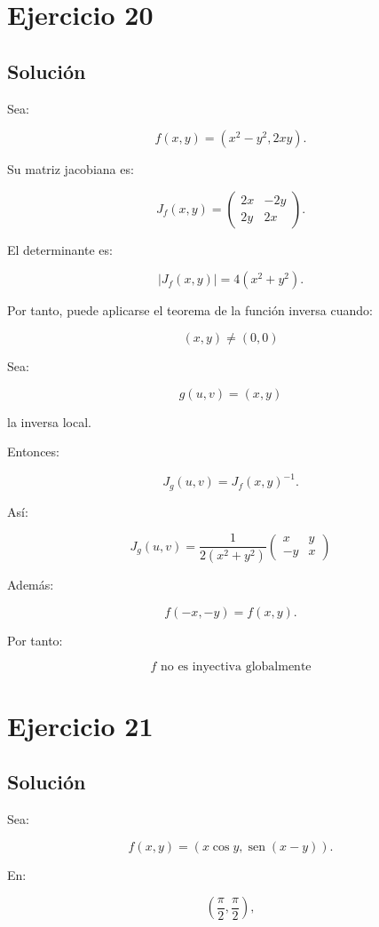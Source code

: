 \documentclass[11pt,a4paper]{article}
\newcommand{\sen}{\operatorname{sen}}
\begin{document}
\section{Ejercicio 20}
\subsection{Solución}

Sea:

\[
f(x,y)
=
\left(
x^2-y^2,
2xy
\right).
\]

Su matriz jacobiana es:

\[
J_f(x,y)
=
\begin{pmatrix}
2x&-2y\\
2y&2x
\end{pmatrix}.
\]

El determinante es:

\[
|J_f(x,y)|
=
4(x^2+y^2).
\]

Por tanto, puede aplicarse el teorema de la función inversa cuando:

\[
\boxed{
(x,y)\neq(0,0)
}
\]

Sea:

\[
g(u,v)=(x,y)
\]

la inversa local.

Entonces:

\[
J_g(u,v)
=
J_f(x,y)^{-1}.
\]

Así:

\[
\boxed{
J_g(u,v)
=
\frac1{2(x^2+y^2)}
\begin{pmatrix}
x&y\\
-y&x
\end{pmatrix}
}
\]

Además:

\[
f(-x,-y)=f(x,y).
\]

Por tanto:

\[
\boxed{
f\text{ no es inyectiva globalmente}
}
\]

\section{Ejercicio 21}
\subsection{Solución}

Sea:

\[
f(x,y)
=
\left(
x\cos y,
\sen(x-y)
\right).
\]

En:

\[
\left(
\frac{\pi}{2},
\frac{\pi}{2}
\right),
\]
\end{document}
